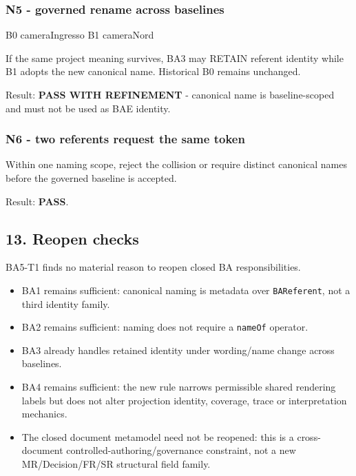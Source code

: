 \documentclass[
  10pt,
  a4paper,
]{article}
\newenvironment{Shaded}{}{}
\newcommand{\NormalTok}[1]{#1}
\providecommand{\tightlist}{%
  \setlength{\itemsep}{0pt}\setlength{\parskip}{0pt}}
\begin{document}
\subsubsection{N5 - governed rename across
baselines}\label{n5---governed-rename-across-baselines}

\begin{Shaded}
\begin{Highlighting}[]
\NormalTok{B0 cameraIngresso}
\NormalTok{B1 cameraNord}
\end{Highlighting}
\end{Shaded}

If the same project meaning survives, BA3 may RETAIN referent identity
while B1 adopts the new canonical name. Historical B0 remains unchanged.

Result: \textbf{PASS WITH REFINEMENT} - canonical name is
baseline-scoped and must not be used as BAE identity.

\subsubsection{N6 - two referents request the same
token}\label{n6---two-referents-request-the-same-token}

Within one naming scope, reject the collision or require distinct
canonical names before the governed baseline is accepted.

Result: \textbf{PASS}.

\subsection{13. Reopen checks}\label{reopen-checks}

BA5-T1 finds no material reason to reopen closed BA responsibilities.

\begin{itemize}
\tightlist
\item
  BA1 remains sufficient: canonical naming is metadata over
  \texttt{BAReferent}, not a third identity family.
\item
  BA2 remains sufficient: naming does not require a \texttt{nameOf}
  operator.
\item
  BA3 already handles retained identity under wording/name change across
  baselines.
\item
  BA4 remains sufficient: the new rule narrows permissible shared
  rendering labels but does not alter projection identity, coverage,
  trace or interpretation mechanics.
\item
  The closed document metamodel need not be reopened: this is a
  cross-document controlled-authoring/governance constraint, not a new
  MR/Decision/FR/SR structural field family.
\end{itemize}
\end{document}
